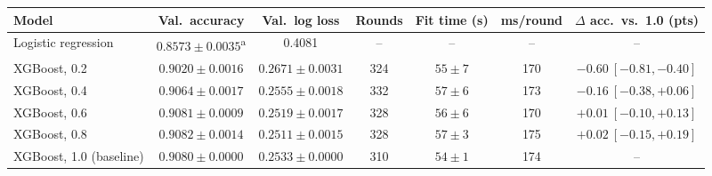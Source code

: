 \begin{tabular}{lcccccc}
\toprule
Model & Val.\ accuracy & Val.\ log loss & Rounds & Fit time (s) & ms/round & $\Delta$ acc.\ vs.\ 1.0 (pts) \\
\midrule
Logistic regression & $0.8573 \pm 0.0035$\textsuperscript{a} & 0.4081 & -- & -- & -- & -- \\
\midrule
XGBoost, 0.2 & $0.9020 \pm 0.0016$ & $0.2671 \pm 0.0031$ & 324 & $55 \pm 7$ & 170 & $-0.60\ [-0.81, -0.40]$ \\
XGBoost, 0.4 & $0.9064 \pm 0.0017$ & $0.2555 \pm 0.0018$ & 332 & $57 \pm 6$ & 173 & $-0.16\ [-0.38, +0.06]$ \\
XGBoost, 0.6 & $0.9081 \pm 0.0009$ & $0.2519 \pm 0.0017$ & 328 & $56 \pm 6$ & 170 & $+0.01\ [-0.10, +0.13]$ \\
XGBoost, 0.8 & $0.9082 \pm 0.0014$ & $0.2511 \pm 0.0015$ & 328 & $57 \pm 3$ & 175 & $+0.02\ [-0.15, +0.19]$ \\
XGBoost, 1.0 (baseline) & $0.9080 \pm 0.0000$ & $0.2533 \pm 0.0000$ & 310 & $54 \pm 1$ & 174 & -- \\
\bottomrule
\end{tabular}
